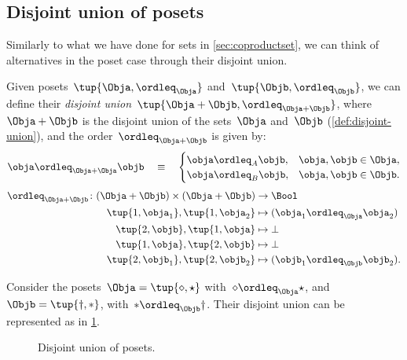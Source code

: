 
\subsection{Disjoint union of posets}

Similarly to what we have done for sets in \cref{sec:coproductset}, we can think of alternatives in the poset case through their disjoint union.

\begin{definition}
    Given posets~$\tup{\Obja, \ordleq_\Obja}$ and~$\tup{\Objb, \ordleq_\Objb}$, we can define their \emph{disjoint union}~$\tup{\Obja + \Objb, \ordleq_{\Obja + \Objb}}$, where~$\Obja + \Objb$
    is the disjoint union of the sets~$\Obja$ and~$\Objb$ (\cref{def:disjoint-union}), and the
    order~$\ordleq_{\Obja + \Objb}$ is given by:
    \begin{equation}
        \obja \ordleq_{\Obja + \Obja} \objb \quad\equiv\quad
        \begin{cases}
            \obja \ordleq_A \objb, & \obja,\objb \in \Obja, \\
            \obja \ordleq_B \objb, & \obja,\objb \in \Objb.
        \end{cases}
    \end{equation}
    \begin{equation}
        \begin{aligned}
            \ordleq_{\Obja+\Objb}\colon (\Obja+\Objb)\times (\Obja+\Objb)&\to \Bool\\
            \tup{1,\obja_1},\tup{1,\obja_2}&\mapsto (\obja_1\ordleq_{\Obja} \obja_2)\\
            \tup{2,\objb},\tup{1,\obja}&\mapsto \bot\\
            \tup{1,\obja},\tup{2,\objb}&\mapsto \bot\\
            \tup{2,\objb_1},\tup{2,\objb_2}&\mapsto (\objb_1\ordleq_\Objb \objb_2).
        \end{aligned}
    \end{equation}
\end{definition}


\begin{example}
    Consider the posets~$\Obja=\tup{\diamond, \star}$ with~$\diamond \ordleq_\Obja \star$, and~$\Objb=\tup{\dagger,\ast}$, with~$\ast \ordleq_\Objb \dagger$. Their disjoint union can be represented as in \cref{fig:poset-coproduct}.

    \begin{figure}[h!]
        \centering
        \caption{Disjoint union of posets. \label{fig:poset-coproduct}}
    \end{figure}
\end{example}
